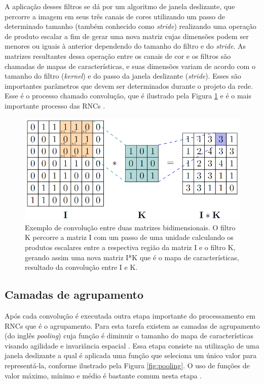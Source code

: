 A aplicação desses filtros se dá por um algoritmo de janela deslizante, que percorre a imagem em seus três canais de cores utilizando um passo de determinado tamanho (também conhecido como \textit{stride}) realizando uma operação de produto escalar a fim de gerar uma nova matriz cujas dimensões podem ser menores ou iguais à anterior dependendo do tamanho do filtro e do \textit{stride}. As matrizes resultantes dessa operação entre os canais de cor e os filtros são chamadas de mapas de características, e suas dimensões variam de acordo com o tamanho do filtro (\textit{kernel}) e do passo da janela deslizante (\textit{stride}). Esses são importantes parâmetros que devem ser determinados durante o projeto da rede. Esse é o processo chamado convolução, que é ilustrado pela Figura \ref{fig:conv2d} e é o mais importante processo das \ac{RNC}s \cite{geron2019maos}. 


\begin{figure}[H]
  \centering
  \includegraphics[width=.5\linewidth]{figures/2_theoric_foundamentations/conv2d.png}
  \caption[Exemplo de convolução entre duas matrizes bidimensionais.]{Exemplo de convolução entre duas matrizes bidimensionais. O filtro K percorre a matriz I com um passo de uma unidade calculando os produtos escalares entre a respectiva região da matriz I e o filtro K, gerando assim uma nova matriz I*K que é o mapa de características, resultado da convolução entre I e K.}
  \label{fig:conv2d}
\end{figure}

\subsection{Camadas de agrupamento}

Após cada convolução é executada outra etapa importante do processamento em \ac{RNC}s que é o agrupamento. Para esta tarefa existem as camadas de agrupamento (do inglês \textit{pooling}) cuja função é diminuir o tamanho do mapa de características visando agilidade e invariância espacial \cite{rawat2017deep}. Essa etapa consiste na utilização de uma janela deslizante a qual é aplicada uma função que seleciona um único valor para representá-la, conforme ilustrado pela Figura \ref{fig:pooling}. O uso de funções de valor máximo, mínimo e médio é bastante comum nesta etapa \cite{geron2019maos}.

